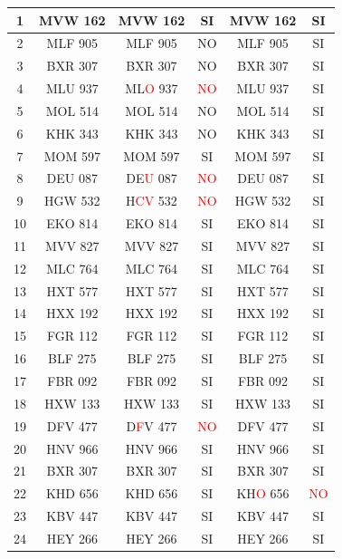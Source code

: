 {\begin{table}[H]
\begin{center}
{\begin{tabular}{||c|c||c|c||c|c||}
        1 & MVW 162 & MVW 162 & SI & MVW 162  & SI \\ \hline
         2 & MLF 905 & MLF 905 & NO & MLF 905 & SI\\ \hline
         3 & BXR 307 & BXR 307 &  NO & BXR 307 & SI \\ \hline
         4 & MLU 937 & ML\textcolor{red}{O} 937 & \textcolor{red}{NO} & MLU 937 & SI \\ \hline
         5 & MOL 514 & MOL 514 & NO & MOL 514 & SI \\ \hline
         6 & KHK 343 & KHK 343 & NO & KHK 343 & SI \\ \hline
         7 & MOM 597 & MOM 597 & SI & MOM 597 & SI \\ \hline
         8 & DEU 087 & DE\textcolor{red}{U} 087 & \textcolor{red}{NO} & DEU 087 & SI \\ \hline
         9 & HGW 532 & H\textcolor{red}{CV} 532 & \textcolor{red}{NO} & HGW 532 & SI \\ \hline
         10 & EKO 814 & EKO 814 & SI & EKO 814 & SI \\ \hline
         11 & MVV 827 & MVV 827 & SI & MVV 827 & SI \\ \hline
         12 & MLC 764 & MLC 764 & SI  & MLC 764 & SI \\ \hline
         13 & HXT 577 & HXT 577 & SI & HXT 577 & SI \\ \hline
         14 & HXX 192 & HXX 192 & SI & HXX 192 & SI \\ \hline
         15 & FGR 112 & FGR 112 & SI & FGR 112 & SI \\ \hline
         16 & BLF 275 & BLF 275 & SI & BLF 275 & SI \\ \hline
         17 & FBR 092 & FBR 092 & SI & FBR 092 & SI \\ \hline
         18 & HXW 133 & HXW 133 & SI & HXW 133 & SI \\ \hline
         19 & DFV 477 & D\textcolor{red}{F}V 477 & \textcolor{red}{NO} & DFV 477 & SI \\ \hline
         20 & HNV 966 & HNV 966 & SI & HNV 966 & SI \\ \hline
         21 & BXR 307 & BXR 307 & SI & BXR 307 & SI \\ \hline
         22 & KHD 656 & KHD 656 & SI & KH\textcolor{red}{O} 656 & \textcolor{red}{NO} \\ \hline
         23 & KBV 447 & KBV 447 & SI & KBV 447 & SI \\ \hline
         24 & HEY 266 & HEY 266 & SI & HEY 266 &  SI \\ \hline

\end{tabular}}
\end{center}
\end{table}}
